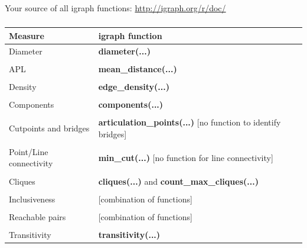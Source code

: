 \documentclass[8pt]{beamer}
\begin{document}
\bgroup
{}
\begin{frame}[plain]{}
\begin{center}
\color{white}{\Huge\insertsection}
\end{center}
\end{frame}
\egroup


\begin{frame}
\frametitle{\insertsection}

Your source of all igraph functions: \url{http://igraph.org/r/doc/}

\end{frame}



\begin{frame}
\frametitle{\insertsection}

\footnotesize
\centering
\begin{tabular}{lp{7.5cm}}
\toprule
\textbf{Measure} & \textbf{igraph function}\\
\hline
Diameter                        & \textbf{diameter(...)}\\
\\
APL                             & \textbf{mean\_distance(...)}\\
\\
Density                         & \textbf{edge\_density(...)}\\
\\
Components                      & \textbf{components(...)}\\
\\
Cutpoints and bridges           & \textbf{articulation\_points(...)} [no function to identify bridges]\\
\\
Point/Line connectivity         & \textbf{min\_cut(...)} [no function for line connectivity]\\
\\
Cliques                         & \textbf{cliques(...)} and \textbf{count\_max\_cliques(...)} \\
\\
Inclusiveness                   & [combination of functions] \\    
\\
Reachable pairs                 & [combination of functions] \\
\\
Transitivity                    & \textbf{transitivity(...)} \\

\bottomrule
\end{tabular}

\end{frame}
\end{document}
